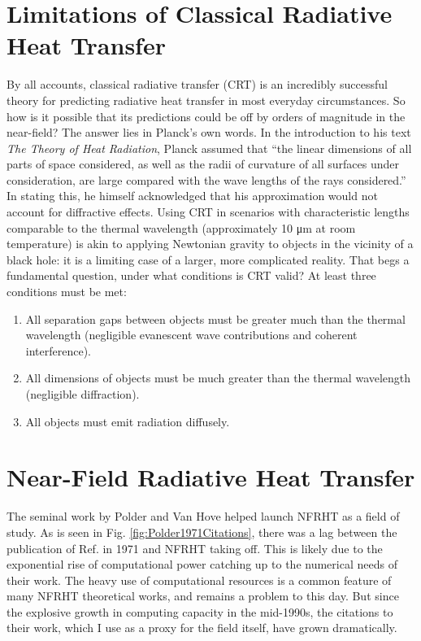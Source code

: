 \section{Limitations of Classical Radiative Heat Transfer}
%
By all accounts, classical radiative transfer (CRT) is an incredibly successful theory for predicting radiative heat transfer in most everyday circumstances. So how is it possible that its predictions could be off by orders of magnitude in the near-field? The answer lies in Planck's own words. In the introduction to his text \textit{The Theory of Heat Radiation},\cite{Planck1959} Planck assumed that ``the linear dimensions of all parts of space considered, as well as the radii of curvature of all surfaces under consideration, are large compared with the wave lengths of the rays considered.'' In stating this, he himself acknowledged that his approximation would not account for diffractive effects. Using CRT in scenarios with characteristic lengths comparable to the thermal wavelength (approximately 10 \si{\micro\meter} at room temperature) is akin to applying Newtonian gravity to objects in the vicinity of a black hole: it is a limiting case of a larger, more complicated reality. That begs a fundamental question, under what conditions is CRT valid? At least three conditions must be met:
%
\begin{enumerate}
	\item All separation gaps between objects must be greater much than the thermal wavelength (negligible evanescent wave contributions and coherent interference).
	\item All dimensions of objects must be much greater than the thermal wavelength (negligible diffraction).
	\item All objects must emit radiation diffusely.
\end{enumerate}


\section{Near-Field Radiative Heat Transfer}
%
The seminal work by Polder and Van Hove\cite{Polder1971} helped launch NFRHT as a field of study. As is seen in Fig. \ref{fig:Polder1971Citations}, there was a lag between the publication of Ref.  in 1971 and NFRHT taking off. This is likely due to the exponential rise of computational power catching up to the numerical needs of their work. The heavy use of computational resources is a common feature of many NFRHT theoretical works, and remains a problem to this day. But since the explosive growth in computing capacity in the mid-1990s, the citations to their work, which I use as a proxy for the field itself, have grown dramatically.

